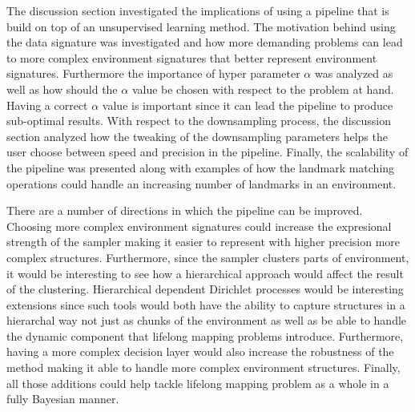 \documentclass[twoside,hidelinks]{article}
\begin{document}
 The discussion section investigated the implications of using a pipeline that is build on top of an unsupervised learning method. 
 The motivation behind using the data signature was investigated and how more demanding problems can lead to more complex environment signatures that better represent environment signatures.
 Furthermore the importance of hyper parameter $\alpha$ was analyzed as well as how should the $\alpha$ value be chosen with respect to the problem at hand. Having a correct $\alpha$ value is important since it can lead the pipeline to produce sub-optimal results. 
 With respect to the downsampling process, the discussion section analyzed how the tweaking of the downsampling parameters helps the user choose between speed and precision in the pipeline.
 Finally, the scalability of the pipeline was presented along with examples of how the landmark matching operations could handle an increasing number of landmarks in an environment.

There are a number of directions in which the pipeline can be improved.
Choosing more complex environment signatures could increase the expresional strength of the sampler making it easier to represent with higher precision more complex structures.
Furthermore, since the sampler clusters parts of environment, it would be interesting to see how a hierarchical approach would affect the result of the clustering.
Hierarchical dependent Dirichlet processes would be interesting extensions since such tools would both have the ability to capture structures in a hierarchal way not just as chunks of the environment as well as be able to handle the dynamic component that lifelong mapping problems introduce. 
Furthermore, having a more complex decision layer would also increase the robustness of the method making it able to handle more complex environment structures. 
Finally, all those additions could help tackle lifelong mapping problem as a whole in a fully Bayesian manner.


\end{document}
